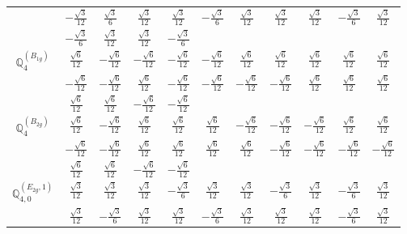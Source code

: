 \documentclass[fleqn,10pt,landscape]{article}
\begin{document}
\begin{itemize}
{\begin{center}
\begin{longtable}{ccccccccccc}
& $ - \frac{\sqrt{3}}{12} $ & $ \frac{\sqrt{3}}{6} $ & $ \frac{\sqrt{3}}{12} $ & $ \frac{\sqrt{3}}{12} $ & $ - \frac{\sqrt{3}}{6} $ & $ \frac{\sqrt{3}}{12} $ & $ \frac{\sqrt{3}}{12} $ & $ \frac{\sqrt{3}}{12} $ & $ - \frac{\sqrt{3}}{6} $ & $ \frac{\sqrt{3}}{12} $ \\
& $ - \frac{\sqrt{3}}{6} $ & $ \frac{\sqrt{3}}{12} $ & $ \frac{\sqrt{3}}{12} $ & $ - \frac{\sqrt{3}}{6} $ & $  $ & $  $ & $  $ & $  $ & $  $ & $  $ \\ \hline
$\mathbb{Q}_{4}^{(B_{1g})}$ & $ \frac{\sqrt{6}}{12} $ & $ - \frac{\sqrt{6}}{12} $ & $ - \frac{\sqrt{6}}{12} $ & $ - \frac{\sqrt{6}}{12} $ & $ - \frac{\sqrt{6}}{12} $ & $ \frac{\sqrt{6}}{12} $ & $ \frac{\sqrt{6}}{12} $ & $ \frac{\sqrt{6}}{12} $ & $ \frac{\sqrt{6}}{12} $ & $ \frac{\sqrt{6}}{12} $ \\
& $ - \frac{\sqrt{6}}{12} $ & $ - \frac{\sqrt{6}}{12} $ & $ \frac{\sqrt{6}}{12} $ & $ - \frac{\sqrt{6}}{12} $ & $ - \frac{\sqrt{6}}{12} $ & $ - \frac{\sqrt{6}}{12} $ & $ - \frac{\sqrt{6}}{12} $ & $ \frac{\sqrt{6}}{12} $ & $ \frac{\sqrt{6}}{12} $ & $ \frac{\sqrt{6}}{12} $ \\
& $ \frac{\sqrt{6}}{12} $ & $ \frac{\sqrt{6}}{12} $ & $ - \frac{\sqrt{6}}{12} $ & $ - \frac{\sqrt{6}}{12} $ & $  $ & $  $ & $  $ & $  $ & $  $ & $  $ \\ \hline
$\mathbb{Q}_{4}^{(B_{2g})}$ & $ \frac{\sqrt{6}}{12} $ & $ - \frac{\sqrt{6}}{12} $ & $ \frac{\sqrt{6}}{12} $ & $ \frac{\sqrt{6}}{12} $ & $ \frac{\sqrt{6}}{12} $ & $ - \frac{\sqrt{6}}{12} $ & $ - \frac{\sqrt{6}}{12} $ & $ - \frac{\sqrt{6}}{12} $ & $ \frac{\sqrt{6}}{12} $ & $ \frac{\sqrt{6}}{12} $ \\
& $ - \frac{\sqrt{6}}{12} $ & $ - \frac{\sqrt{6}}{12} $ & $ \frac{\sqrt{6}}{12} $ & $ \frac{\sqrt{6}}{12} $ & $ \frac{\sqrt{6}}{12} $ & $ \frac{\sqrt{6}}{12} $ & $ - \frac{\sqrt{6}}{12} $ & $ - \frac{\sqrt{6}}{12} $ & $ - \frac{\sqrt{6}}{12} $ & $ - \frac{\sqrt{6}}{12} $ \\
& $ \frac{\sqrt{6}}{12} $ & $ \frac{\sqrt{6}}{12} $ & $ - \frac{\sqrt{6}}{12} $ & $ - \frac{\sqrt{6}}{12} $ & $  $ & $  $ & $  $ & $  $ & $  $ & $  $ \\ \hline
$\mathbb{Q}_{4,0}^{(E_{2g},1)}$ & $ \frac{\sqrt{3}}{12} $ & $ \frac{\sqrt{3}}{12} $ & $ \frac{\sqrt{3}}{12} $ & $ - \frac{\sqrt{3}}{6} $ & $ \frac{\sqrt{3}}{12} $ & $ \frac{\sqrt{3}}{12} $ & $ - \frac{\sqrt{3}}{6} $ & $ \frac{\sqrt{3}}{12} $ & $ - \frac{\sqrt{3}}{6} $ & $ \frac{\sqrt{3}}{12} $ \\
& $ \frac{\sqrt{3}}{12} $ & $ - \frac{\sqrt{3}}{6} $ & $ \frac{\sqrt{3}}{12} $ & $ \frac{\sqrt{3}}{12} $ & $ - \frac{\sqrt{3}}{6} $ & $ \frac{\sqrt{3}}{12} $ & $ \frac{\sqrt{3}}{12} $ & $ \frac{\sqrt{3}}{12} $ & $ - \frac{\sqrt{3}}{6} $ & $ \frac{\sqrt{3}}{12} $ \\

\end{longtable}
\end{center}}
\end{itemize}
\end{document}
